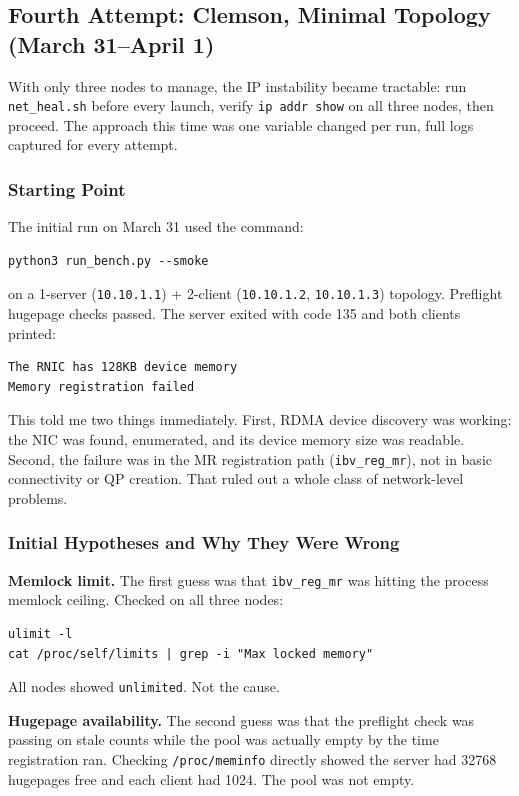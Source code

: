 \documentclass[10pt]{article}
\begin{document}
\subsection{Fourth Attempt: Clemson, Minimal Topology (March 31--April 1)}

With only three nodes to manage, the IP instability became tractable: run
\texttt{net\_heal.sh} before every launch, verify \texttt{ip addr show} on all
three nodes, then proceed.
The approach this time was one variable changed per run, full logs captured
for every attempt.

\subsubsection{Starting Point}

The initial run on March 31 used the command:
\begin{lstlisting}
python3 run_bench.py --smoke
\end{lstlisting}
on a 1-server (\texttt{10.10.1.1}) + 2-client (\texttt{10.10.1.2}, \texttt{10.10.1.3})
topology.
Preflight hugepage checks passed.
The server exited with code 135 and both clients printed:
\begin{lstlisting}
The RNIC has 128KB device memory
Memory registration failed
\end{lstlisting}
This told me two things immediately.
First, RDMA device discovery was working: the NIC was found, enumerated, and its
device memory size was readable.
Second, the failure was in the MR registration path (\texttt{ibv\_reg\_mr}),
not in basic connectivity or QP creation.
That ruled out a whole class of network-level problems.

\subsubsection{Initial Hypotheses and Why They Were Wrong}

\textbf{Memlock limit.}
The first guess was that \texttt{ibv\_reg\_mr} was hitting the process memlock ceiling.
Checked on all three nodes:
\begin{lstlisting}
ulimit -l
cat /proc/self/limits | grep -i "Max locked memory"
\end{lstlisting}
All nodes showed \texttt{unlimited}.
Not the cause.

\textbf{Hugepage availability.}
The second guess was that the preflight check was passing on stale counts while
the pool was actually empty by the time registration ran.
Checking \texttt{/proc/meminfo} directly showed the server had 32768 hugepages
free and each client had 1024.
The pool was not empty.
\end{document}
